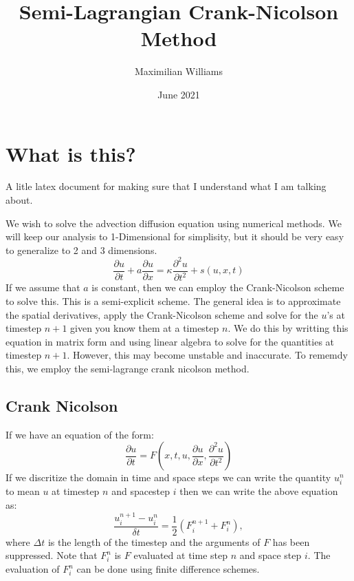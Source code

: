 \documentclass{article}
\title{Semi-Lagrangian Crank-Nicolson Method}
\author{Maximilian Williams}
\date{June 2021}
\begin{document}
\maketitle

\section*{What is this?}
A litle latex document for making sure that I understand what I am talking about.


We wish to solve the advection diffusion equation using numerical methods. We will keep our analysis to 1-Dimensional for simplisity, but it should be very easy to generalize to 2 and 3 dimensions.
\begin{equation}
	\frac{\partial u}{\partial t} + a \frac{\partial u}{\partial x} = \kappa \frac{\partial^2 u}{\partial t^2} + s(u,x,t)
\end{equation}
If we assume that $a$ is constant, then we can employ the Crank-Nicolson scheme to solve this. This is a semi-explicit scheme. The general idea is to approximate the spatial derivatives, apply the Crank-Nicolson scheme and solve for the $u$'s
at timestep $n+1$ given you know them at a timestep $n$. We do this by writting this equation in matrix form and using linear algebra to solve for the quantities at timestep $n+1$. However, this may become unstable and inaccurate. To rememdy this, we employ the semi-lagrange crank nicolson method.




\subsection*{Crank Nicolson}
If we have an equation of the form:
\begin{equation}
	\frac{\partial u}{\partial t} = F(x,t,u,\frac{\partial u}{\partial x}, \frac{\partial^2 u }{\partial t^2} )
\end{equation}
If we discritize the domain in time and space steps we can write the quantity $u^{n}_i$ to mean $u$ at timestep $n$ and spacestep $i$ then we can write the above equation as:
\begin{equation}
	\frac{u^{n+1}_i - u^{n}_i}{\delta t} = \frac{1}{2} (F^{n+1}_{i} + F^{n}_i), 
\end{equation}
where $\Delta t$ is the length of the timestep and the arguments of $F$ has been suppressed. Note that $F^{n}_i$ is $F$ evaluated at time step $n$ and space step $i$. The evaluation of $F^{n}_i$ can be done using finite difference schemes. 
\end{document}
